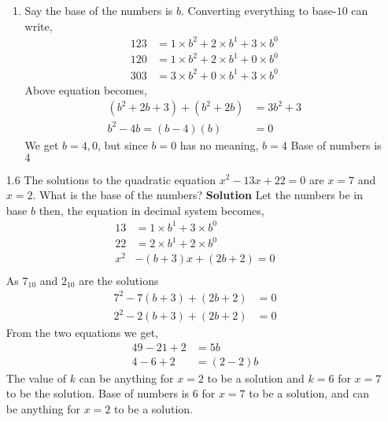 \documentclass[a4paper,12pt]{article}
\begin{document}
\begin{enumerate}
\begin{enumerate}
  \item Say the base of the numbers is $b$. Converting everything to base-$10$ can write,
    \begin{align*}
      123 &= 1 \times b^2 + 2 \times b^1 + 3 \times b^0 \\
      120 &= 1 \times b^2 + 2 \times b^1 + 0\times b^0\\
      303 &= 3 \times b^2 + 0 \times b^1 + 3\times b^0
    \end{align*}
  Above equation becomes,
    \begin{align*}
      (b^2 + 2b +3) + (b^2 + 2b) &= 3b^2 + 3\\
      b^2 - 4b = (b-4)(b) &= 0
    \end{align*}
    We get $b = 4,0$, but since $b=0$ has no meaning, $b = 4$\newline
    Base of numbers is $4$

\end{enumerate}
\item[1.6] The solutions to the quadratic equation $x^2-13x+22 = 0$ are $x = 7$ and $x = 2$. What is the base of the numbers?\newline
\textbf{Solution}\newline
Let the numbers be in base $b$ then, the equation in decimal system becomes,
\begin{align*}
  13 &= 1\times b^1+3\times b^0\\
  22 &= 2\times b^1 + 2\times b^0\\
  x^2 &- (b+3)x + (2b+2) = 0\\
\end{align*}
As $7_{10}$ and $2_{10}$ are the solutions
\begin{align*}
	7^2 - 7(b+3) + (2b+2) &= 0\\
	2^2 - 2(b+3) + (2b+2) &= 0
\end{align*}
From the two equations we get,
\begin{align*}
  49 -21 +2 &= 5b\\
    4-6+2 &= (2-2)b
\end{align*}
The value of $k$ can be anything for $x=2$ to be a solution and $k = 6$ for $x=7$ to be the solution.\newline
Base of numbers is $6$ for $x=7$ to be a solution, and can be anything for $x=2$ to be a solution.


\end{enumerate}
\end{document}

